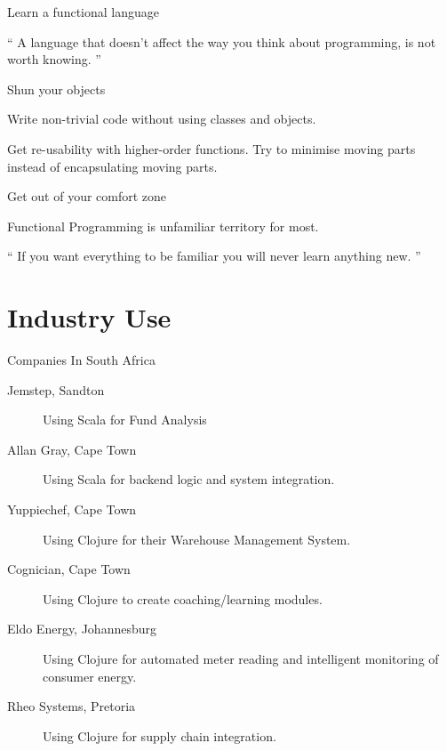 \documentclass[mathserif]{beamer}
\begin{document}
\begin{frame}{Learn a functional language}

\begin{exampleblock}{}
  {\Large ``
    A language that doesn't affect the way you think about programming, is not worth knowing.
  ''}
  \vskip5mm
  \hspace*{}
\end{exampleblock}

\end{frame}

\begin{frame}{Shun your objects}

  {\Huge Write non-trivial code without using classes and objects.}
  \vskip5mm
  
  {\Large Get \alert{re-usability} with higher-order functions.}
  \vskip2mm
  {\Large Try to \alert{minimise moving parts} instead of encapsulating moving parts.}
  {\small\cite{mfeathers}}

\end{frame}

\begin{frame}{Get out of your comfort zone}

  {\Large Functional Programming is unfamiliar territory for most.}

\begin{exampleblock}{}
  {\Large ``
    If you want everything to be familiar you will never learn anything new.
  ''}
  \vskip5mm
  \hspace*{}
\end{exampleblock}

\end{frame}

\section{Industry Use}

\begin{frame}{Companies In South Africa}

  \begin{description}
  \item[Jemstep, Sandton] Using Scala for Fund Analysis
  \item[Allan Gray, Cape Town] Using Scala for backend logic and system integration.
  \item[Yuppiechef, Cape Town] Using Clojure for their Warehouse
    Management System.
  \item[Cognician, Cape Town] Using Clojure to create coaching/learning modules.
  \item[Eldo Energy, Johannesburg] Using Clojure for automated meter
    reading and intelligent monitoring of consumer energy.
  \item[Rheo Systems, Pretoria] Using Clojure for supply chain integration.
  \end{description}

\end{frame}
\end{document}
